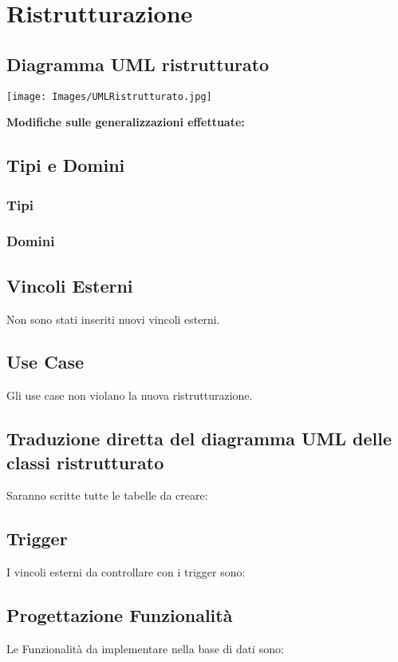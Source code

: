 \documentclass[12pt, letterpaper]{article}
\begin{document}
\section{Ristrutturazione}
\subsection{Diagramma UML ristrutturato}
\begin{center}
    \texttt{[image: Images/UMLRistrutturato.jpg]}
\end{center} 
\newpage
\textbf{Modifiche sulle generalizzazioni effettuate:}\\


\subsection{Tipi e Domini}
\subsubsection{Tipi}

\subsubsection{Domini}

\subsection{Vincoli Esterni}
Non sono stati inseriti nuovi vincoli esterni.
\subsection{Use Case}
Gli use case non violano la nuova ristrutturazione.
\newpage
\subsection{Traduzione diretta del diagramma UML delle classi ristrutturato}
Saranno scritte tutte le tabelle da creare:\\

\newpage \subsection{Trigger}
I vincoli esterni da controllare con i trigger sono:\\

\newpage \subsection{Progettazione Funzionalità}
Le Funzionalità da implementare nella base di dati sono:\\
\end{document}
